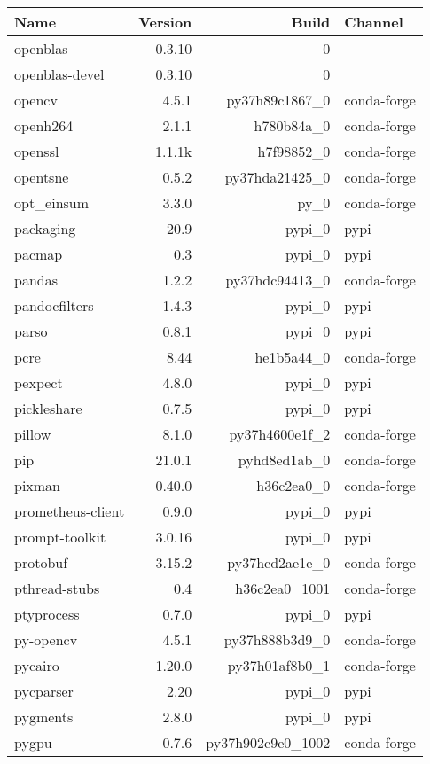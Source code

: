 \begin{table}
	\begin{center}
		\begin{tabular}{|l|r|r|l|}
			\textbf{Name} &\textbf{Version} &\textbf{Build} &\textbf{Channel} \\
			\hline
			openblas &0.3.10 & 0 & \\
			openblas-devel &0.3.10 & 0 & \\
			opencv &4.5.1 & py37h89c1867\_0 &conda-forge \\
			openh264 &2.1.1 & h780b84a\_0 &conda-forge \\
			openssl &1.1.1k & h7f98852\_0 &conda-forge \\
			opentsne &0.5.2 & py37hda21425\_0 &conda-forge \\
			opt\_einsum &3.3.0 & py\_0 &conda-forge \\
			packaging &20.9 & pypi\_0 &pypi \\
			pacmap &0.3 & pypi\_0 &pypi \\
			pandas &1.2.2 & py37hdc94413\_0 &conda-forge \\
			pandocfilters &1.4.3 & pypi\_0 &pypi \\
			parso &0.8.1 & pypi\_0 &pypi \\
			pcre &8.44 & he1b5a44\_0 &conda-forge \\
			pexpect &4.8.0 & pypi\_0 &pypi \\
			pickleshare &0.7.5 & pypi\_0 &pypi \\
			pillow &8.1.0 & py37h4600e1f\_2 &conda-forge \\
			pip &21.0.1 & pyhd8ed1ab\_0 &conda-forge \\
			pixman &0.40.0 & h36c2ea0\_0 &conda-forge \\
			prometheus-client &0.9.0 & pypi\_0 &pypi \\
			prompt-toolkit &3.0.16 & pypi\_0 &pypi \\
			protobuf &3.15.2 & py37hcd2ae1e\_0 &conda-forge \\
			pthread-stubs &0.4 & h36c2ea0\_1001 &conda-forge \\
			ptyprocess &0.7.0 & pypi\_0 &pypi \\
			py-opencv &4.5.1 & py37h888b3d9\_0 &conda-forge \\
			pycairo &1.20.0 & py37h01af8b0\_1 &conda-forge \\
			pycparser &2.20 & pypi\_0 &pypi \\
			pygments &2.8.0 & pypi\_0 &pypi \\
			pygpu &0.7.6 & py37h902c9e0\_1002 & conda-forge \\

\end{tabular}
\end{center}
\end{table}
